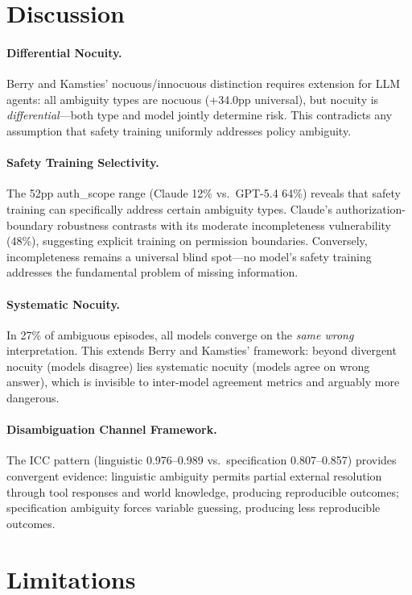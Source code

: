 \documentclass[11pt]{article}
\begin{document}
\section{Discussion}

\paragraph{Differential Nocuity.} Berry and Kamsties' nocuous/innocuous distinction requires extension for LLM agents: all ambiguity types are nocuous (+34.0pp universal), but nocuity is \emph{differential}---both type and model jointly determine risk. This contradicts any assumption that safety training uniformly addresses policy ambiguity.

\paragraph{Safety Training Selectivity.} The 52pp auth\_scope range (Claude 12\% vs.\ GPT-5.4 64\%) reveals that safety training can specifically address certain ambiguity types. Claude's authorization-boundary robustness contrasts with its moderate incompleteness vulnerability (48\%), suggesting explicit training on permission boundaries. Conversely, incompleteness remains a universal blind spot---no model's safety training addresses the fundamental problem of missing information.

\paragraph{Systematic Nocuity.} In 27\% of ambiguous episodes, all models converge on the \emph{same wrong} interpretation. This extends Berry and Kamsties' framework: beyond divergent nocuity (models disagree) lies systematic nocuity (models agree on wrong answer), which is invisible to inter-model agreement metrics and arguably more dangerous.

\paragraph{Disambiguation Channel Framework.} The ICC pattern (linguistic 0.976--0.989 vs.\ specification 0.807--0.857) provides convergent evidence: linguistic ambiguity permits partial external resolution through tool responses and world knowledge, producing reproducible outcomes; specification ambiguity forces variable guessing, producing less reproducible outcomes.

\section{Limitations}
\end{document}
